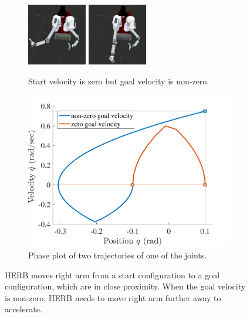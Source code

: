 \documentclass[letterpaper, 10 pt, conference]{ieeeconf}  %
\begin{document}
\begin{figure}[t!]
\begin{minipage}[t]{0.64\linewidth}
\begin{subfigure}[b]{\textwidth}
		\includegraphics[height=2.7cm]{fig/motivation/fast3}
		\includegraphics[height=2.7cm]{fig/motivation/fast4}
		\caption{Start velocity is zero but goal velocity is non-zero.}
		\label{fig:motivation:fast}
	\end{subfigure}
    \end{minipage}
    \begin{minipage}[t]{0.35\linewidth}
    	\begin{subfigure}[c]{\textwidth}
    		\includegraphics[width=\textwidth]{fig/motivation/phase_plot}
    		\caption{Phase plot of two trajectories of one of the joints.}
    		\label{fig:motivation:phase_plot}
        \end{subfigure}
   	\end{minipage}
	\caption{HERB moves right arm from a start configuration to a goal configuration, which are in close proximity.
    When the goal velocity is non-zero, HERB needs to move right arm further away to accelerate.
	}
	\label{fig:motivation}
\end{figure} 
\end{document}
